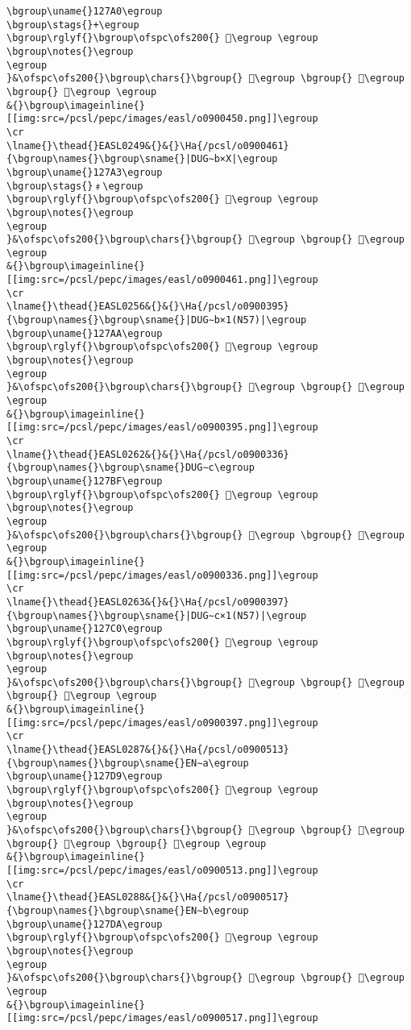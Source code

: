 \begin{verbatim}
\bgroup\uname{}127A0\egroup
\bgroup\stags{}+\egroup
\bgroup\rglyf{}\bgroup\ofspc\ofs200{} 𒞠\egroup \egroup
\bgroup\notes{}\egroup
\egroup
}&\ofspc\ofs200{}\bgroup\chars{}\bgroup{} 𒞶\egroup \bgroup{} 𒞺\egroup \bgroup{} 𒞠\egroup \egroup
&{}\bgroup\imageinline{}[[img:src=/pcsl/pepc/images/easl/o0900450.png]]\egroup
\cr
\lname{}\thead{}EASL0249&{}&{}\Ha{/pcsl/o0900461}{\bgroup\names{}\bgroup\sname{}|DUG∼b×X|\egroup
\bgroup\uname{}127A3\egroup
\bgroup\stags{}﹟\egroup
\bgroup\rglyf{}\bgroup\ofspc\ofs200{} 𒞣\egroup \egroup
\bgroup\notes{}\egroup
\egroup
}&\ofspc\ofs200{}\bgroup\chars{}\bgroup{} 𒞷\egroup \bgroup{} 𒞣\egroup \egroup
&{}\bgroup\imageinline{}[[img:src=/pcsl/pepc/images/easl/o0900461.png]]\egroup
\cr
\lname{}\thead{}EASL0256&{}&{}\Ha{/pcsl/o0900395}{\bgroup\names{}\bgroup\sname{}|DUG∼b×1(N57)|\egroup
\bgroup\uname{}127AA\egroup
\bgroup\rglyf{}\bgroup\ofspc\ofs200{} 𒞪\egroup \egroup
\bgroup\notes{}\egroup
\egroup
}&\ofspc\ofs200{}\bgroup\chars{}\bgroup{} 𒞸\egroup \bgroup{} 𒞪\egroup \egroup
&{}\bgroup\imageinline{}[[img:src=/pcsl/pepc/images/easl/o0900395.png]]\egroup
\cr
\lname{}\thead{}EASL0262&{}&{}\Ha{/pcsl/o0900336}{\bgroup\names{}\bgroup\sname{}DUG∼c\egroup
\bgroup\uname{}127BF\egroup
\bgroup\rglyf{}\bgroup\ofspc\ofs200{} 𒞿\egroup \egroup
\bgroup\notes{}\egroup
\egroup
}&\ofspc\ofs200{}\bgroup\chars{}\bgroup{} 𒞼\egroup \bgroup{} 𒞿\egroup \egroup
&{}\bgroup\imageinline{}[[img:src=/pcsl/pepc/images/easl/o0900336.png]]\egroup
\cr
\lname{}\thead{}EASL0263&{}&{}\Ha{/pcsl/o0900397}{\bgroup\names{}\bgroup\sname{}|DUG∼c×1(N57)|\egroup
\bgroup\uname{}127C0\egroup
\bgroup\rglyf{}\bgroup\ofspc\ofs200{} 𒟀\egroup \egroup
\bgroup\notes{}\egroup
\egroup
}&\ofspc\ofs200{}\bgroup\chars{}\bgroup{} 𒞾\egroup \bgroup{} 𒞽\egroup \bgroup{} 𒟀\egroup \egroup
&{}\bgroup\imageinline{}[[img:src=/pcsl/pepc/images/easl/o0900397.png]]\egroup
\cr
\lname{}\thead{}EASL0287&{}&{}\Ha{/pcsl/o0900513}{\bgroup\names{}\bgroup\sname{}EN∼a\egroup
\bgroup\uname{}127D9\egroup
\bgroup\rglyf{}\bgroup\ofspc\ofs200{} 𒟙\egroup \egroup
\bgroup\notes{}\egroup
\egroup
}&\ofspc\ofs200{}\bgroup\chars{}\bgroup{} 𒟖\egroup \bgroup{} 𒟗\egroup \bgroup{} 𒟘\egroup \bgroup{} 𒟙\egroup \egroup
&{}\bgroup\imageinline{}[[img:src=/pcsl/pepc/images/easl/o0900513.png]]\egroup
\cr
\lname{}\thead{}EASL0288&{}&{}\Ha{/pcsl/o0900517}{\bgroup\names{}\bgroup\sname{}EN∼b\egroup
\bgroup\uname{}127DA\egroup
\bgroup\rglyf{}\bgroup\ofspc\ofs200{} 𒟚\egroup \egroup
\bgroup\notes{}\egroup
\egroup
}&\ofspc\ofs200{}\bgroup\chars{}\bgroup{} 𒟚\egroup \bgroup{} 𒟜\egroup \egroup
&{}\bgroup\imageinline{}[[img:src=/pcsl/pepc/images/easl/o0900517.png]]\egroup

\end{verbatim}

